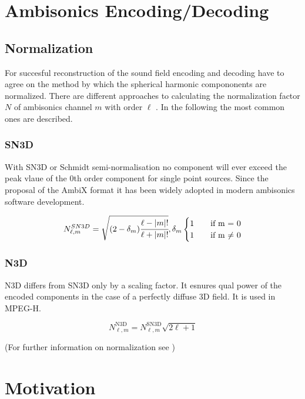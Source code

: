 \documentclass[a4paper, 10pt, twocolumn]{article}
\begin{document}
\section{Ambisonics Encoding/Decoding} \label{sec:AmbisonicsEncodingDecoding}

\subsection{Normalization}

For succesful reconstruction of the sound field encoding and decoding have to agree on the method by which the spherical harmonic compononents are normalized. There are different approaches to calculating the normalization factor $N$ of ambisonics channel $m$ with order $\ell$ . In the following the most common ones are described.

\subsubsection{SN3D}

With SN3D or Schmidt semi-normalisation no component will ever exceed the peak vlaue of the 0th order component for single point sources. \autocite{ambix} Since the proposal of the AmbiX format it has been widely adopted in modern ambisonics software development.

\[
    N_{\ell,m}^{SN3D} = \sqrt{(2-\delta_m)\cfrac{\ell-|m|!}{\ell+|m|!}},\delta_m 
    \begin{cases} 
    1 & \quad \text{if m = 0}\\
    1 & \quad \text{if m $\neq$ 0}
    
    \end{cases}
\]

\subsubsection{N3D}

N3D differs from SN3D only by a scaling factor. It esnures qual power of the encoded components in the case of a perfectly diffuse 3D field.\autocite{daniel} It is used in MPEG-H.

\[
    N_{\ell, m}^{\mathrm{N} 3 \mathrm{D}}=N_{\ell, m}^{\mathrm{SN} 3 \mathrm{D}} \sqrt{2 \ell+1}    
\]

(For further information on normalization see \autocite{norm})

\section{Motivation} \label{sec:Motivation}
\end{document}
